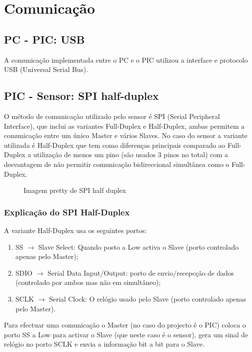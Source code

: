 \documentclass[a4paper]{article}
\begin{document}


\tableofcontents
\pagebreak

\section{Comunicação}

\subsection{PC - PIC: USB}
A comunicação implementada entre o PC e o PIC utilizou a interface e protocolo USB (Universal Serial Bus).

\subsection{PIC - Sensor: SPI half-duplex}
O método de comunicação utilizado pelo sensor é SPI (Serial Peripheral Interface), que inclui as variantes Full-Duplex e Half-Duplex, ambas permitem a comunicação entre um único Master e vários Slaves.
No caso do sensor a variante utilizada é Half-Duplex que tem como diferenças principais comparado ao Full-Duplex a utilização de menos um pino (são usados 3 pinos no total) com a desvantagem de não permitir comunicação bidireccional simultânea como o Full-Duplex.

\begin{figure}[H]
	\centering

	\caption{Imagem pretty de SPI half duplex}
	\label{fig:SPI_halfduplex}
\end{figure}

\subsubsection{Explicação do SPI Half-Duplex}  
A variante Half-Duplex usa os seguintes portos:
\begin{enumerate}
	\item SS $\rightarrow$ Slave Select: Quando posto a Low activa o Slave (porto controlado apenas pelo Master);
	\item SDIO $\rightarrow$ Serial Data Input/Output: porto de envio/recepcção de dados (controlado por ambos mas não em simultâneo);
	\item SCLK $\rightarrow$ Serial Clock: O relógio usado pelo Slave (porto controlado apenas pelo Master).
\end{enumerate}

Para efectuar uma comunicação o Master (no caso do projecto é o PIC) coloca o porto SS a Low para activar o Slave (que neste caso é o sensor), gera um sinal de relógio no porto SCLK e envia a informação bit a bit para o Slave.
\end{document}
